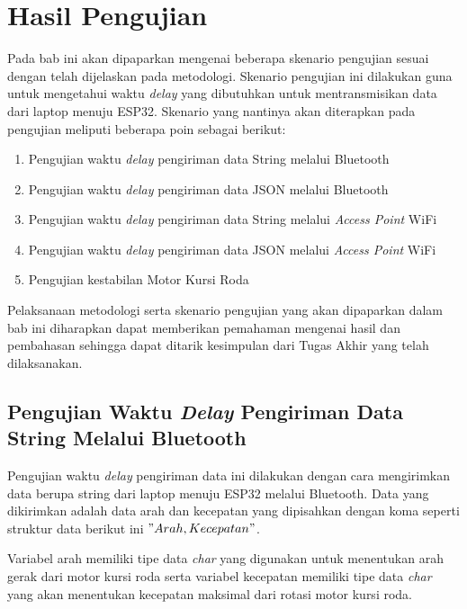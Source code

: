 \section{Hasil Pengujian}
\label{sec:hasil pengujian}

Pada bab ini akan dipaparkan mengenai beberapa skenario pengujian sesuai dengan telah dijelaskan pada metodologi. Skenario pengujian ini dilakukan guna untuk mengetahui waktu \emph{delay} yang dibutuhkan untuk mentransmisikan data dari laptop menuju ESP32. Skenario yang nantinya akan diterapkan pada pengujian meliputi beberapa poin sebagai berikut:

\begin{enumerate}[nosep]
  \item Pengujian waktu \emph{delay} pengiriman data String melalui Bluetooth
  \item Pengujian waktu \emph{delay} pengiriman data JSON melalui Bluetooth
  \item Pengujian waktu \emph{delay} pengiriman data String melalui \emph{Access Point} WiFi
  \item Pengujian waktu \emph{delay} pengiriman data JSON melalui \emph{Access Point} WiFi
  \item Pengujian kestabilan Motor Kursi Roda
\end{enumerate}

Pelaksanaan metodologi serta skenario pengujian yang akan dipaparkan dalam bab ini diharapkan dapat memberikan pemahaman mengenai hasil dan pembahasan sehingga dapat ditarik kesimpulan dari Tugas Akhir yang telah dilaksanakan.

\subsection{Pengujian Waktu \emph{Delay} Pengiriman Data String Melalui Bluetooth}
\label{sec:delayBluetooth}

Pengujian waktu \emph{delay} pengiriman data ini dilakukan dengan cara mengirimkan data berupa string dari laptop menuju ESP32 melalui Bluetooth. Data yang dikirimkan adalah data arah dan kecepatan yang dipisahkan dengan koma seperti struktur data berikut ini \("Arah,Kecepatan"\).



Variabel arah memiliki tipe data \emph{char} yang digunakan untuk menentukan arah gerak dari motor kursi roda serta variabel kecepatan memiliki tipe data \emph{char} yang akan menentukan kecepatan maksimal dari rotasi motor kursi roda. %

